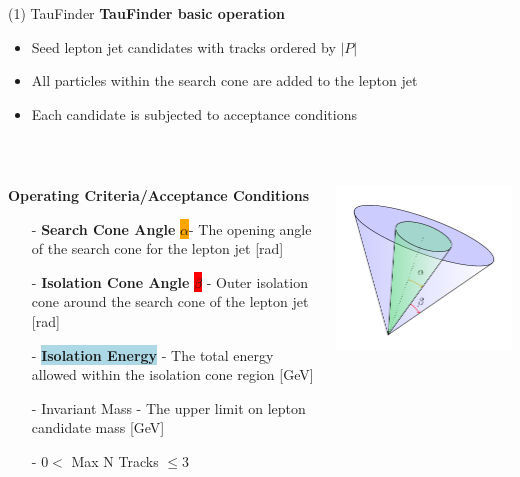 \documentclass[10pt]{beamer}
\begin{document}
\begin{frame}{(1) TauFinder}
\textbf{TauFinder basic operation}\\
\begin{itemize}
\item Seed lepton jet candidates with tracks ordered by $|P|$\\
\item All particles within the search cone are added to the lepton jet\\
\item Each candidate is subjected to acceptance conditions \\
\end{itemize}
\quad \quad \\
\begin{columns}
\begin{column}{0.5\textwidth}
\scriptsize \textbf{Operating Criteria/Acceptance Conditions}
 \begin{itemize}
 \scriptsize
 	\item[-]\textbf{Search Cone Angle} \colorbox{orange}{$\alpha$}- The opening angle of the search cone for the lepton jet [rad]
 	\item[-] \textbf{Isolation Cone Angle} \colorbox{red}{$\beta$} - Outer isolation cone around the search cone of the lepton jet [rad]
 	\item[-] \colorbox{lightblue}{\textbf{Isolation Energy}} - The total energy allowed within the isolation cone region [GeV]
 	\item[-]Invariant Mass - The upper limit on lepton candidate mass [GeV]
 	\item[-] $0 <$ Max N Tracks $\leq 3$
 \end{itemize}
\end{column}
\begin{column}{0.5\textwidth}
\includegraphics[scale=0.7]{cone.pdf}
\end{column}
\end{columns} 
 
\end{frame}
\end{document}
